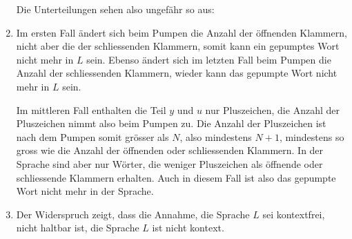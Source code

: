 \begin{loesung}
\begin{enumerate}
Die Unterteilungen sehen also ungefähr so aus:
\begin{center}
\def\rechteck{
	\fill[color=gray!40] \punkt{0}{0} rectangle \punkt{22}{1};
	\foreach \x in {0.5,1.5,...,8}{
		\node[color=white] at \punkt{\x}{0.5} {$\texttt{(}\mathstrut$};
	}
	\foreach \x in {8.5,9.5,...,15}{
		\node[color=white] at \punkt{\x}{0.5} {$\texttt{+}\mathstrut$};
	}
	\foreach \x in {15.5,16.5,...,22}{
		\node[color=white] at \punkt{\x}{0.5} {$\texttt{)}\mathstrut$};
	}
	\draw \punkt{0}{0} rectangle \punkt{22}{1};
	\draw \punkt{8}{0} -- \punkt{8}{1};
	\draw \punkt{15}{0} -- \punkt{15}{1};
	\node at \punkt{8}{1} [above] {$N+1$};
	\node at \punkt{15}{1} [above] {$2N+1$};
	\node at \punkt{22}{1} [above] {$3N+2$};
}
\def\unterteilung#1{
	\rechteck
	\kasten{0}{#1}{blue}{x}
	\kasten{#1}{#1+1}{red}{y}
	\kasten{#1+1}{#1+2.5}{darkgreen}{z}
	\kasten{#1+2.5}{#1+4}{red}{u}
	\kasten{#1+4}{22}{blue}{v}
	\draw[line width=0.4pt] \punkt{#1}{-0.6} -- \punkt{#1}{1.1};
	\draw[line width=0.4pt] \punkt{#1+4}{-0.6} -- \punkt{#1+4}{1.1};
	\draw[<->] \punkt{#1}{-0.3} -- \punkt{#1+4}{-0.3};
	\node at \punkt{#1+2}{-0.2} [below] {$\le N$};
}
\end{center}
\item
Im ersten Fall ändert sich beim Pumpen die Anzahl der
öffnenden Klammern, nicht aber die der schliessenden Klammern, somit
kann ein gepumptes Wort nicht mehr in $L$ sein.
Ebenso ändert sich im letzten Fall beim Pumpen die Anzahl der schliessenden
Klammern, wieder kann das gepumpte Wort nicht mehr in $L$ sein.

Im mittleren Fall enthalten die Teil $y$ und $u$ nur Pluszeichen, die Anzahl
der Pluszeichen nimmt also beim Pumpen zu.
Die Anzahl der Pluszeichen ist nach dem Pumpen somit grösser als $N$, also
mindestens $N+1$, mindestens so gross wie die Anzahl der öffnenden oder
schliessenden Klammern.
In der Sprache sind aber nur Wörter, die weniger Pluszeichen als öffnende oder
schliessende Klammern erhalten.
Auch in diesem Fall ist also das gepumpte Wort nicht mehr in der Sprache.
\item
Der Widerspruch zeigt, dass die Annahme, die Sprache $L$ sei kontextfrei,
nicht haltbar ist,
die Sprache $L$ ist nicht kontext.
\qedhere
\end{enumerate}
\end{loesung}
